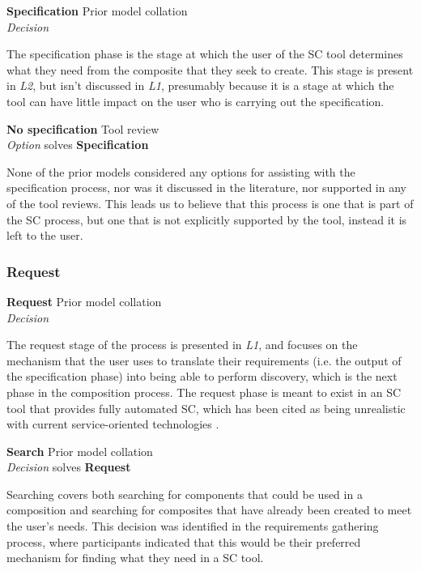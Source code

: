 \textbf{Specification} \hfill Prior model collation \cite{Mehandjiev2012} \\ \emph{Decision} \hfill 

The specification phase is the stage at which the user of the SC tool determines what they need from the composite that they seek to create. This stage is present in \emph{L2}, but isn't discussed in \emph{L1}, presumably because it is a stage at which the tool can have little impact on the user who is carrying out the specification.

\textbf{No specification} \hfill Tool review \\ \emph{Option} \hfill solves \textbf{Specification}

None of the prior models considered any options for assisting with the specification process, nor was it discussed in the literature, nor supported in any of the tool reviews. This leads us to believe that this process is one that is part of the SC process, but one that is not explicitly supported by the tool, instead it is left to the user.

\subsubsection{Request}

\textbf{Request} \hfill Prior model collation \cite{Mehandjiev2012} \\ \emph{Decision} \hfill 

The request stage of the process is presented in \emph{L1}, and focuses on the mechanism that the user uses to translate their requirements (i.e. the output of the specification phase) into being able to perform discovery, which is the next phase in the composition process. The request phase is meant to exist in an SC tool that provides fully automated SC, which has been cited as being unrealistic with current service-oriented technologies \cite{Vulcu2008}.

\textbf{Search} \hfill Prior model collation \cite{Grammel2010} \\ \emph{Decision} \hfill solves \textbf{Request}

Searching covers both searching for components that could be used in a composition and searching for composites that have already been created to meet the user's needs. This decision was identified in the requirements gathering process, where participants indicated that this would be their preferred mechanism for finding what they need in a SC tool.

